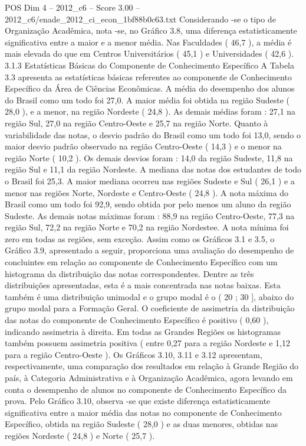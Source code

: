 \begin{textsample}{POS Dim 4 – 2012\_c6 – Score 3.00 – 2012\_c6/enade\_2012\_ci\_econ\_1bf88b0c63.txt}
Considerando -se o tipo de Organização Acadêmica, nota -se, no Gráfico 3.8, uma diferença estatisticamente significativa entre a maior e a menor média.
Nas Faculdades ( 46,7 ), a média é mais elevada do que em Centros Universitários ( 45,1 ) e Universidades ( 42,6 ). 3.1.3 Estatísticas Básicas do Componente de Conhecimento Específico A Tabela 3.3 apresenta as estatísticas básicas referentes ao componente de Conhecimento Específico da Área de Ciências Econômicas.
A média do desempenho dos alunos do Brasil como um todo foi 27,0.
A maior média foi obtida na região Sudeste ( 28,0 ), e a menor, na região Nordeste ( 24,8 ).
As demais médias foram : 27,1 na região Sul, 27,0 na região Centro-Oeste e 25,7 na região Norte.
Quanto à variabilidade das notas, o desvio padrão do Brasil como um todo foi 13,0, sendo o maior desvio padrão observado na região Centro-Oeste ( 14,3 ) e o menor na região Norte ( 10,2 ).
Os demais desvios foram : 14,0 da região Sudeste, 11,8 na região Sul e 11,1 da região Nordeste.
A mediana das notas dos estudantes de todo o Brasil foi 25,3.
A maior mediana ocorreu nas regiões Sudeste e Sul ( 26,1 ) e a menor nas regiões Norte, Nordeste e Centro-Oeste ( 24,8 ).
A nota máxima do Brasil como um todo foi 92,9, sendo obtida por pelo menos um aluno da região Sudeste.
As demais notas máximas foram : 88,9 na região Centro-Oeste, 77,3 na região Sul, 72,2 na região Norte e 70,2 na região Nordestee.
A nota mínima foi zero em todas as regiões, sem exceção.
Assim como os Gráficos 3.1 e 3.5, o Gráfico 3.9, apresentado a seguir, proporciona uma avaliação do desempenho de concluintes em relação ao componente de Conhecimento Específico com um histograma da distribuição das notas correspondentes.
Dentre as três distribuições apresentadas, esta é a mais concentrada nas notas baixas.
Esta também é uma distribuição unimodal e o grupo modal é o ( 20 ; 30 ], abaixo do grupo modal para a Formação Geral.
O coeficiente de assimetria da distribuição das notas do componente de Conhecimento Específico é positivo ( 0,60 ), indicando assimetria à direita.
Em todas as Grandes Regiões os histogramas também possuem assimetria positiva ( entre 0,27 para a região Nordeste e 1,12 para a região Centro-Oeste ).
Os Gráficos 3.10, 3.11 e 3.12 apresentam, respectivamente, uma comparação dos resultados em relação à Grande Região do país, à Categoria Administrativa e à Organização Acadêmica, agora levando em conta o desempenho de alunos no componente de Conhecimento Específico da prova.
Pelo Gráfico 3.10, observa -se que existe diferença estatisticamente significativa entre a maior média das notas no componente de Conhecimento Específico, obtida na região Sudeste ( 28,0 ) e as duas menores, obtidas nas regiões Nordeste ( 24,8 ) e Norte ( 25,7 ).

\end{textsample}
